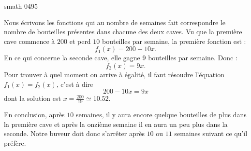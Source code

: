 
\begin{corrige}{smath-0495}

    Nous écrivons les fonctions qui au nombre de semaines fait correspondre le nombre de bouteilles présentes dans chacune des deux caves. Vu que la première cave commence à \( 200\) et perd \( 10\) bouteilles par semaine, la première fonction est :
    \begin{equation}
        f_1(x)=200-10x.
    \end{equation}
    En ce qui concerne la seconde cave, elle gagne \( 9\) bouteilles par semaine. Donc :
    \begin{equation}
        f_2(x)=9x.
    \end{equation}
    Pour trouver à quel moment on arrive à égalité, il faut résoudre l'équation \( f_1(x)=f_2(x)\), c'est à dire
    \begin{equation}
        200-10x=9x
    \end{equation}
    dont la solution est \( x=\frac{ 200 }{ 19 }\simeq 10.52\).

    En conclusion, après \( 10\) semaines, il y aura encore quelque bouteilles de plus dans la première cave et après la onzième semaine il en aura un peu plus dans la seconde. Notre buveur doit donc s'arrêter après \( 10\) ou \( 11\) semaines suivant ce qu'il préfère.

\end{corrige}
